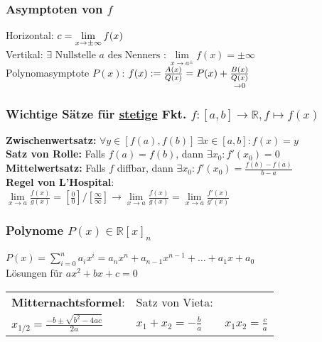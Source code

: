 \documentclass[german]{latex4ei/latex4ei_sheet}
\begin{document}
\begin{sectionbox}
    \subsubsection{Asymptoten von $f$}
    Horizontal: $c=\lim\limits_{x\rightarrow \pm \infty} f(x)$\\
    Vertikal: $\exists \text{ Nullstelle } a \text{ des Nenners }: \lim\limits_{x \rightarrow a^{\pm}} f(x) = \pm \infty$\\
    Polynomasymptote $P(x)$: $f(x):=\frac{A(x)}{Q(x)}=P(x)+ \underset{\rightarrow 0}{\frac{B(x)}{Q(x)}}$ \\
    \subsubsection{Wichtige Sätze für \underline{stetige} Fkt. $f: [a,b] \rightarrow \mathbb R, f \mapsto f(x)$ }
    \textbf{Zwischenwertsatz:} $\forall y \in [f(a),f(b)]\ \exists x\in [a,b]:f(x)=y$\\
    \textbf{Satz von Rolle:} Falls $f(a)=f(b)$, dann $\exists x_0: f' (x_0) = 0$\\
    \textbf{Mittelwertsatz:} Falls $f$ diffbar, dann $\exists x_0:f'(x_0)=\frac{f(b)-f(a)}{b-a}$\\
    \textbf{Regel von L'Hospital}:\\ $\lim\limits_{x \rightarrow a} \frac{f(x)}{g(x)} = \left[ \frac{0}{0} \right] / \left[ \frac{\infty}{\infty} \right] \rightarrow \lim\limits_{x \rightarrow a} \frac{f(x)}{g(x)} = \lim\limits_{x \rightarrow a} \frac{f'(x)}{g'(x)}$
    
    \subsubsection{Polynome $P(x)\in\mathbb R[x]_n$}
    $P(x)=\sum_{i=0}^n a_ix^i=a_n x^n+a_{n-1} x^{n-1}+\dotsc+a_1x+a_0$ \\
    Lösungen für $ax^2+bx+c=0$ \\
    \begin{tabular}{l|l}
    \textbf{Mitternachtsformel}:  &  Satz von Vieta:\\
    $x_{1/2}=\frac{-b\pm\sqrt{b^2-4ac}}{2a}$  \quad & \quad   $x_1 + x_2 = - \frac{b}{a} \qquad x_1 x_2 = \frac{c}{a}$
    \end{tabular}
    \breakline

\end{sectionbox}
\end{document}

